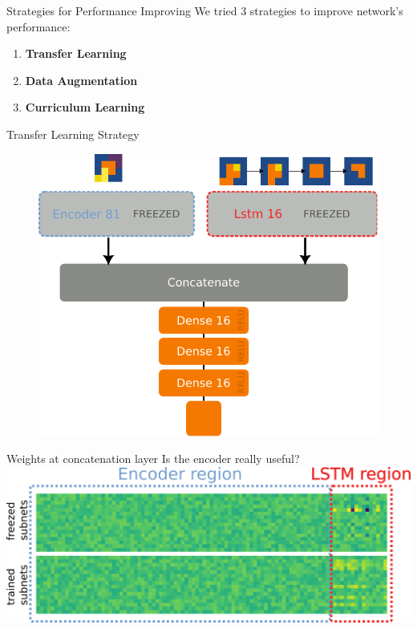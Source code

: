\documentclass{beamer}
\begin{document}
\begin{frame}{Strategies for Performance Improving}
    We tried 3 strategies to improve network's performance:
        \begin{enumerate}
            \item \textbf{Transfer Learning}
            \item \textbf{Data Augmentation}
            \item \textbf{Curriculum Learning}  
        \end{enumerate}

    
\end{frame}



\begin{frame}{Transfer Learning Strategy}
    \begin{figure}
        \centering
        \includegraphics[width=.7\linewidth]{figures/freezetraining_2.pdf}
    \end{figure}
\end{frame}


\begin{frame}{Weights at concatenation layer}
    Is the encoder really useful?
    \vfill
    \includegraphics[width=\linewidth]{figures/weights_comparison.png}
\end{frame}
\end{document}
